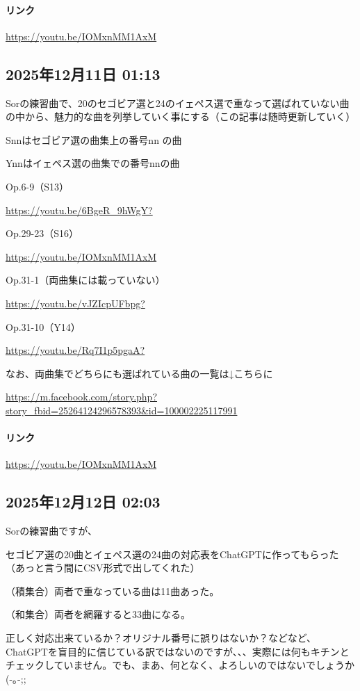 \paragraph{リンク}
\url{https://youtu.be/IOMxnMM1AxM}

\subsection*{2025年12月11日 01:13}

Sorの練習曲で、20のセゴビア選と24のイェペス選で重なって選ばれていない曲の中から、魅力的な曲を列挙していく事にする（この記事は随時更新していく）

Snnはセゴビア選の曲集上の番号nn の曲

Ynnはイェペス選の曲集での番号nnの曲

Op.6-9（S13）

\url{https://youtu.be/6BgeR_9hWgY?}

Op.29-23（S16）

\url{https://youtu.be/IOMxnMM1AxM}

Op.31-1（両曲集には載っていない）

\url{https://youtu.be/vJZIcpUFbpg?}

Op.31-10（Y14）

\url{https://youtu.be/Rq7I1p5pgaA?}

なお、両曲集でどちらにも選ばれている曲の一覧は↓こちらに

\url{https://m.facebook.com/story.php?story_fbid=25264124296578393&id=100002225117991}

\paragraph{リンク}
\url{https://youtu.be/IOMxnMM1AxM}

\subsection*{2025年12月12日 02:03}

Sorの練習曲ですが、

セゴビア選の20曲とイェペス選の24曲の対応表をChatGPTに作ってもらった（あっと言う間にCSV形式で出してくれた）

（積集合）両者で重なっている曲は11曲あった。

（和集合）両者を網羅すると33曲になる。

正しく対応出来ているか？オリジナル番号に誤りはないか？などなど、ChatGPTを盲目的に信じている訳ではないのですが、、、実際には何もキチンとチェックしていません。でも、まあ、何となく、よろしいのではないでしょうか (-｡-;;

